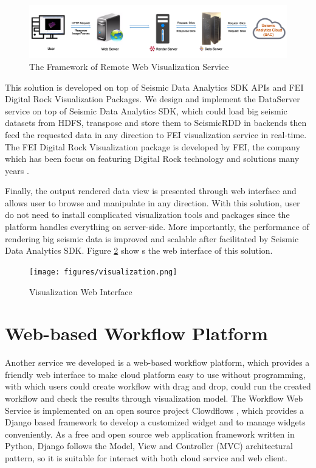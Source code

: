\begin{figure}[h]
\centering
\includegraphics[scale=0.3]{figures/visualization_framework.png}
\caption{The Framework of Remote Web Visualization Service}
\label{visualization_framework}
\end{figure}

This solution is developed on top of Seismic Data Analytics SDK APIs and FEI Digital Rock Visualization Packages. We design and implement the DataServer service on top of Seismic Data Analytics SDK, which could load big seismic datasets from HDFS, transpose and store them to SeismicRDD in backends then feed the requested data in any direction to FEI visualization service in real-time. The FEI Digital Rock Visualization package is developed by FEI, the company which has been focus on featuring Digital Rock technology and solutions many years \cite{FEICompany}. 

Finally, the output rendered data view is presented through web interface and allows user to browse and manipulate in any direction. With this solution, user do not need to install complicated visualization tools and packages since the platform handles everything on server-side. More importantly, the performance of rendering big seismic data is improved and scalable after facilitated by Seismic Data Analytics SDK. Figure \ref{visualization} show s the web interface of this solution.

\begin{figure}[h]
\centering
\texttt{[image: figures/visualization.png]}
\caption{Visualization Web Interface}
\label{visualization}
\end{figure}


\section{Web-based Workflow Platform}

Another service we developed is a web-based workflow platform, which provides a friendly web interface to make cloud platform easy to use without programming, with which users could create workflow with drag and drop, could run the created workflow and check the results through visualization model. The Workflow Web Service is implemented on an open source project Clowdflows \cite{Clowdflows}, which provides a Django based framework to develop a customized widget and to manage widgets conveniently. As a free and open source web application framework written in Python, Django follows the Model, View and Controller (MVC) architectural pattern, so it is suitable for interact with both cloud service and web client.

